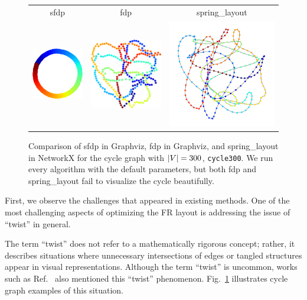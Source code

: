 \documentclass[dvipdfmx,10pt,journal,compsoc]{IEEEtran}
\begin{document}
\begin{figure}[t]
    \centering
    \begin{tabular}{ccc}
        \textsf{sfdp}                                                   & \textsf{fdp} & \textsf{spring\_layout} \\
        \includegraphics[width=0.273\columnwidth]{cycle/cycle_sfdp.png} &
        \includegraphics[width=0.273\columnwidth]{cycle/cycle_fdp.png}  &
        \includegraphics[width=0.273\columnwidth]{cycle/cycle_fr.png}                                            \\
    \end{tabular}
    \caption{
        Comparison of \textsf{sfdp} in Graphviz, \textsf{fdp} in Graphviz, and \textsf{spring\_layout} in NetworkX for the cycle graph with $\abs{V} = 300$, \texttt{cycle300}.
        We run every algorithm with the default parameters, but both \textsf{fdp} and \textsf{spring\_layout} fail to visualize the cycle beautifully.
    }
    \label{fig:cycle}
\end{figure}

First, we observe the challenges that appeared in existing methods.
One of the most challenging aspects of optimizing the FR layout is addressing the issue of ``twist'' in general.

The term ``twist'' does not refer to a mathematically rigorous concept; rather, it describes situations where unnecessary intersections of edges or tangled structures appear in visual representations.
Although the term ``twist'' is uncommon, works such as Ref.~\cite{cheongSnapshotVisualizationComplex2018} also mentioned this ``twist'' phenomenon. Fig.~\ref{fig:cycle} illustrates cycle graph examples of this situation.
\end{document}
